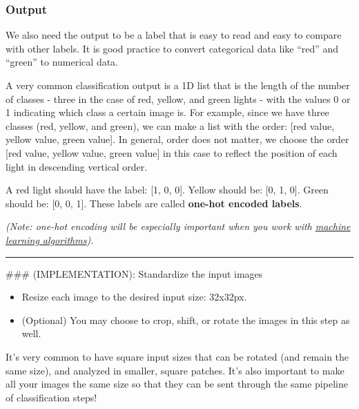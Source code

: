 \documentclass[11pt]{article}
\providecommand{\tightlist}{%
      \setlength{\itemsep}{0pt}\setlength{\parskip}{0pt}}
\begin{document}
\hypertarget{output}{%
\subsubsection{Output}\label{output}}

We also need the output to be a label that is easy to read and easy to
compare with other labels. It is good practice to convert categorical
data like ``red'' and ``green'' to numerical data.

A very common classification output is a 1D list that is the length of
the number of classes - three in the case of red, yellow, and green
lights - with the values 0 or 1 indicating which class a certain image
is. For example, since we have three classes (red, yellow, and green),
we can make a list with the order: {[}red value, yellow value, green
value{]}. In general, order does not matter, we choose the order {[}red
value, yellow value, green value{]} in this case to reflect the position
of each light in descending vertical order.

A red light should have the label: {[}1, 0, 0{]}. Yellow should be:
{[}0, 1, 0{]}. Green should be: {[}0, 0, 1{]}. These labels are called
\textbf{one-hot encoded labels}.

\emph{(Note: one-hot encoding will be especially important when you work
with
\href{https://machinelearningmastery.com/how-to-one-hot-encode-sequence-data-in-python/}{machine
learning algorithms}).}

    \begin{center}\rule{0.5\linewidth}{\linethickness}\end{center}

 \#\#\# (IMPLEMENTATION): Standardize the input images

\begin{itemize}
\tightlist
\item
  Resize each image to the desired input size: 32x32px.
\item
  (Optional) You may choose to crop, shift, or rotate the images in this
  step as well.
\end{itemize}

It's very common to have square input sizes that can be rotated (and
remain the same size), and analyzed in smaller, square patches. It's
also important to make all your images the same size so that they can be
sent through the same pipeline of classification steps!
\end{document}
